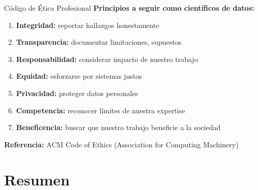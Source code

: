 \documentclass[aspectratio=169]{beamer}
\begin{document}
\begin{frame}{Código de Ética Profesional}
\textbf{Principios a seguir como científicos de datos:}

\begin{enumerate}
\item \textbf{Integridad:} reportar hallazgos honestamente

\item \textbf{Transparencia:} documentar limitaciones, supuestos

\item \textbf{Responsabilidad:} considerar impacto de nuestro trabajo

\item \textbf{Equidad:} esforzarse por sistemas justos

\item \textbf{Privacidad:} proteger datos personales

\item \textbf{Competencia:} reconocer límites de nuestra expertise

\item \textbf{Beneficencia:} buscar que nuestro trabajo beneficie a la sociedad
\end{enumerate}

\vspace{0.3cm}

\textbf{Referencia:} ACM Code of Ethics (Association for Computing Machinery)
\end{frame}

\section{Resumen}
\end{document}

